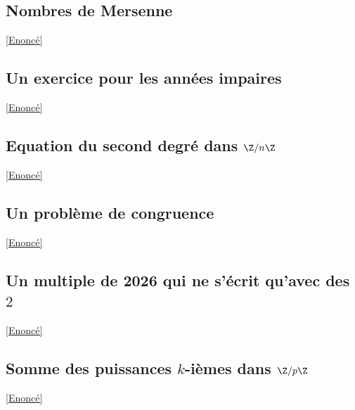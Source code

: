 \documentclass[8pt]{book}
\begin{document}
	\subsection{Nombres de Mersenne}
	\label{Nombres de Mersenne corrigé}
	\textcolor{blue}{\hyperref[Nombres de Mersenne]{[Enoncé]}}\\
	
	\subsection{Un exercice pour les années impaires}
	\label{Un exercice pour les années impaires corrigé}
	\textcolor{blue}{\hyperref[Un exercice pour les années impaires]{[Enoncé]}}\\
	
	\subsection{Equation du second degré dans $\Z/n\Z$}
	\label{Equation du second degré dans Z/nZ corrigé}
	\textcolor{blue}{\hyperref[Equation du second degré dans Z/nZ]{[Enoncé]}}\\
	
	\subsection{Un problème de congruence}
	\label{Un problème de congruence corrigé}
	\textcolor{blue}{\hyperref[Un problème de congruence]{[Enoncé]}}\\
	
	\subsection{Un multiple de 2026 qui ne s'écrit qu'avec des $2$}
	\label{Un multiple de 2026 corrigé}
	\textcolor{blue}{\hyperref[Un multiple de 2026]{[Enoncé]}}\\
	
	\subsection{Somme des puissances $k$-ièmes dans $\Z/p\Z$}
	\label{Somme des puissances k iemes dans Z/pZ corrigé}
	\textcolor{blue}{\hyperref[Somme des puissances k iemes dans Z/pZ]{[Enoncé]}}\\
	
\end{document}
